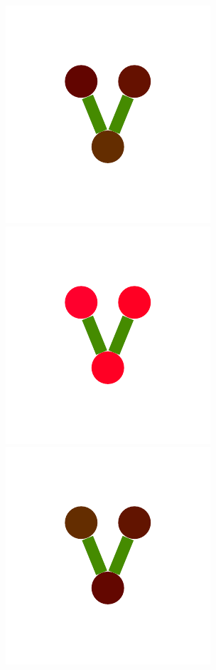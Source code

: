 \documentclass[a4paper,10pt]{article}
\begin{document}
\begin{figure}
{    \includegraphics[scale=.16]{../figures/vector/6-5-tree-induced-14.pdf}
    \includegraphics[scale=.16]{../figures/vector/6-5-tree-induced-15.pdf}
    \includegraphics[scale=.16]{../figures/vector/6-5-tree-induced-16.pdf}
}
\end{figure}
\end{document}
